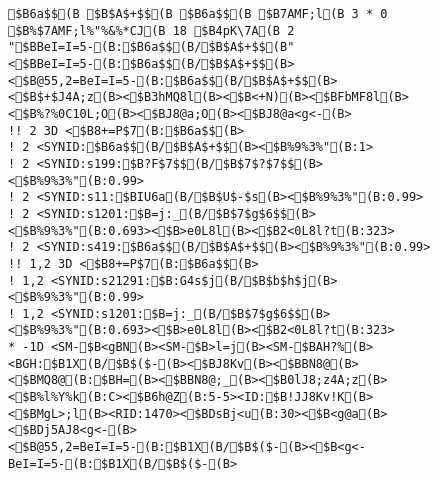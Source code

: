 \documentclass[a4j]{jarticle}
\begin{document}
{{{{\begin{figure}[t]
\begin{center}
\begin{minipage}{\hsize}
\begin{verbatim}
$B6a$$(B $B$A$+$$(B $B6a$$(B $B7AMF;l(B 3 * 0 $B%$7AMF;l%"%&%*CJ(B 18 $B4pK\7A(B 2 "$BBeI=I=5-(B:$B6a$$(B/$B$A$+$$(B" <$BBeI=I=5-(B:$B6a$$(B/$B$A$+$$(B><$B@55,2=BeI=I=5-(B:$B6a$$(B/$B$A$+$$(B><$B$+$J4A;z(B><$B3hMQ8l(B><$B<+N)(B><$BFbMF8l(B><$B%?%0C10L;O(B><$BJ8@a;O(B><$BJ8@a<g<-(B>
!! 2 3D <$B8+=P$7(B:$B6a$$(B>
! 2 <SYNID:$B6a$$(B/$B$A$+$$(B><$B%9%3%"(B:1>
! 2 <SYNID:s199:$B?F$7$$(B/$B$7$?$7$$(B><$B%9%3%"(B:0.99>
! 2 <SYNID:s11:$BIU6a(B/$B$U$-$s(B><$B%9%3%"(B:0.99>
! 2 <SYNID:s1201:$B=j:_(B/$B$7$g$6$$(B><$B%9%3%"(B:0.693><$B>e0L8l(B><$B2<0L8l?t(B:323>
! 2 <SYNID:s419:$B6a$$(B/$B$A$+$$(B><$B%9%3%"(B:0.99>
!! 1,2 3D <$B8+=P$7(B:$B6a$$(B>
! 1,2 <SYNID:s21291:$B:G4s$j(B/$B$b$h$j(B><$B%9%3%"(B:0.99>
! 1,2 <SYNID:s1201:$B=j:_(B/$B$7$g$6$$(B><$B%9%3%"(B:0.693><$B>e0L8l(B><$B2<0L8l?t(B:323>
* -1D <SM-$B<gBN(B><SM-$B>l=j(B><SM-$BAH?%(B><BGH:$B1X(B/$B$($-(B><$BJ8Kv(B><$BBN8@(B><$BMQ8@(B:$BH=(B><$BBN8@;_(B><$B0lJ8;z4A;z(B><$B%l%Y%k(B:C><$B6h@Z(B:5-5><ID:$B!JJ8Kv!K(B><$BMgL>;l(B><RID:1470><$BDsBj<u(B:30><$B<g@a(B><$BDj5AJ8<g<-(B><$B@55,2=BeI=I=5-(B:$B1X(B/$B$($-(B><$B<g<-BeI=I=5-(B:$B1X(B/$B$($-(B>

\end{verbatim}
\end{minipage}
\end{center}
\end{figure}}}}}
\end{document}
